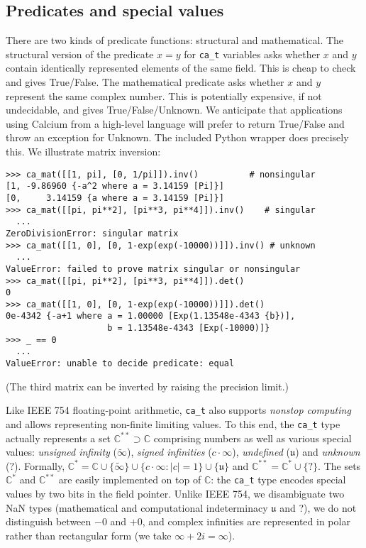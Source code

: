 \documentclass[11pt,a4paper]{article}
\begin{document}
\subsection{Predicates and special values}

There are two kinds of predicate functions: structural
and mathematical. The structural version
of the predicate $x = y$ for \texttt{ca\_t} variables
asks whether $x$ and $y$ contain identically
represented elements
of the same field. This is cheap to check and
gives True/False.
The mathematical predicate asks whether $x$ and $y$ represent
the same complex number.
This is potentially expensive, if not undecidable, and gives True/False/Unknown.
We anticipate that applications using Calcium from a high-level
language will prefer to return True/False and throw an exception for Unknown.
The included Python wrapper does precisely this.
We illustrate matrix inversion:

\begin{small}
\begin{verbatim}
>>> ca_mat([[1, pi], [0, 1/pi]]).inv()          # nonsingular
[1, -9.86960 {-a^2 where a = 3.14159 [Pi]}]
[0,     3.14159 {a where a = 3.14159 [Pi]}]
>>> ca_mat([[pi, pi**2], [pi**3, pi**4]]).inv()    # singular
  ...
ZeroDivisionError: singular matrix
>>> ca_mat([[1, 0], [0, 1-exp(exp(-10000))]]).inv() # unknown
  ...
ValueError: failed to prove matrix singular or nonsingular
>>> ca_mat([[pi, pi**2], [pi**3, pi**4]]).det()
0
>>> ca_mat([[1, 0], [0, 1-exp(exp(-10000))]]).det()
0e-4342 {-a+1 where a = 1.00000 [Exp(1.13548e-4343 {b})],
                    b = 1.13548e-4343 [Exp(-10000)]}
>>> _ == 0
  ...
ValueError: unable to decide predicate: equal
\end{verbatim}
\end{small}

(The third matrix can be inverted by raising the precision limit.)

Like IEEE 754 floating-point arithmetic, 
\texttt{ca\_t} also supports \emph{nonstop computing}
and allows representing non-finite limiting values.
To this end, the \texttt{ca\_t} type actually represents a set $\mathbb{C}^{**} \supset \mathbb{C}$
comprising numbers as well as
various special values:
\emph{unsigned infinity} ($\tilde \infty$),
\emph{signed infinities} ($c \cdot \infty$),
\emph{undefined} ($\mathfrak{u}$)
and \emph{unknown} ($?$).
Formally, $\mathbb{C}^{*} = \mathbb{C} \cup \{\tilde \infty \}
\cup \{c \cdot \infty : |c| = 1\} \cup \{ \mathfrak{u} \}$ and
$\mathbb{C}^{**} = \mathbb{C}^{*} \cup \{ ? \}$.
The sets $\mathbb{C}^{*}$ and $\mathbb{C}^{**}$ are
easily implemented on top of $\mathbb{C}$:
the \texttt{ca\_t} type encodes
special values by two bits in the field pointer.
Unlike IEEE 754,
we disambiguate two NaN types
(mathematical and computational indeterminacy $\mathfrak{u}$ and ?),
we do not distinguish between $-0$ and $+0$,
and complex infinities are represented in polar rather than rectangular form
(we take $\infty + 2i = \infty$).
\end{document}

